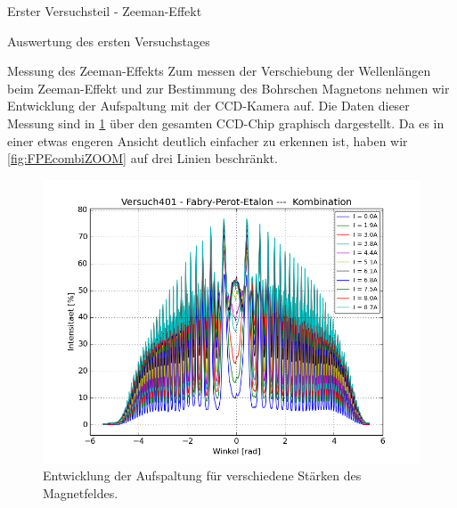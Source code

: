 \documentclass[pdftex, a4paper,11pt, twoside, ngerman]{report}
\begin{document}
\begin{chapter}{Erster Versuchsteil - Zeeman-Effekt}
\begin{section}{Auswertung des ersten Versuchstages}
      \begin{subsection}{Messung des Zeeman-Effekts}
        \label{chp:Zeeman:sec:AuswertungMessung}
        Zum messen der Verschiebung der Wellenlängen beim Zeeman-Effekt und zur
        Bestimmung des Bohrschen Magnetons nehmen wir Entwicklung der
        Aufspaltung mit der CCD-Kamera auf. Die Daten dieser Messung sind in
        \cref{fig:FPEcombi} über den gesamten CCD-Chip graphisch dargestellt.
        Da es in einer etwas engeren Ansicht deutlich einfacher zu erkennen ist,
        haben wir \cref{fig:FPEcombiZOOM} auf drei Linien beschränkt.
        \begin{figure}[ht]
          \centering
          \begin{minipage}{0.48\textwidth}
            \centering
            \includegraphics[width=\textwidth]
      {Figures/Versuch401-Fabry-Perot-Etalon-Kombination_Winkel_Intensitaet.png}
            \caption{Entwicklung der Aufspaltung für verschiedene Stärken des
                Magnetfeldes.}
            \label{fig:FPEcombi}
          \end{minipage}\quad
          \begin{minipage}{0.48\textwidth}
            \centering

\end{minipage}
\end{figure}
\end{subsection}
\end{section}
\end{chapter}
\end{document}
